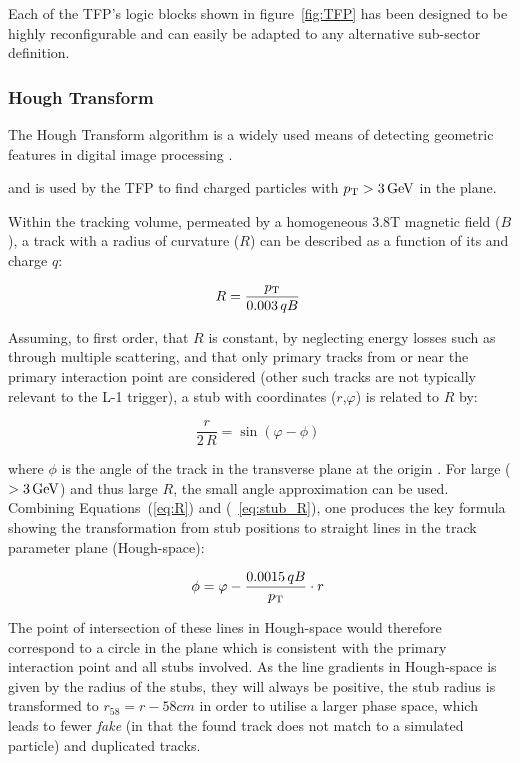 Each of the TFP's logic blocks shown in figure~\ref{fig:TFP} has been designed to be highly reconfigurable and can easily be adapted to any alternative sub-sector definition.

\subsubsection{Hough Transform}
The Hough Transform algorithm is a widely used means of detecting geometric features in digital image processing \cite{HT}.


 and is used by the TFP to find charged particles with $p_{\mathrm{T}} > 3\,\text{Ge\hspace{-.08em}V}$ in the \rphi plane. 

Within the tracking volume, permeated by a homogeneous 3.8T magnetic field ($B$), a track  with a radius of curvature ($R$) can be described as a function of its \pT and charge $q$:

\begin{equation}
R = \frac{p_{\mathrm{T}}}{0.003\,qB} \;
\label{eq:R}
\end{equation}

Assuming, to first order, that $R$ is constant, by neglecting energy losses such as through multiple scattering, and that only primary tracks from or near the primary interaction point are considered (other such tracks are not typically relevant to the L-1 trigger), a stub with coordinates ($r$,$\varphi$) is related to $R$ by:

\begin{equation}
\frac r{2\,R} = \sin\left(\varphi-\phi\right) \;
\label{eq:stub_R}
\end{equation}

where $\phi$ is the angle of the track in the transverse plane at the origin \cite{markthesis}. 
For large \pT ($> 3\,\text{Ge\hspace{-.08em}V}$) and thus large $R$, the small angle approximation can be used. Combining Equations~(\ref{eq:R}) and (~\ref{eq:stub_R}), one produces the key formula showing the transformation from stub positions to straight lines in the track parameter plane (Hough-space):

\begin{equation}
\phi = \varphi - \frac{0.0015\,qB}{p_{\mathrm{T}}}\cdot r \;
\label{eq:localHT}
\end{equation}

The point of intersection of these lines in Hough-space would therefore correspond to a circle in the \rphi plane which is consistent with the primary interaction point and all stubs involved.
As the line gradients in Hough-space is given by the radius of the stubs, they will always be positive, the stub radius is transformed to $r_{58} = r - 58cm$ in order to utilise a larger phase space, which leads to fewer \textit{fake} (in that the found track does not match to a simulated particle) and duplicated tracks.

